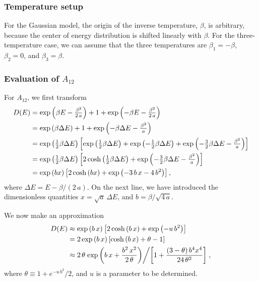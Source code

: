 \documentclass[aip,jcp,preprint,notitlepage, superscriptaddress]{revtex4-1}
\begin{document}
\subsubsection{Temperature setup}



For the Gaussian model,
the origin of the inverse temperature, $\beta$,
is arbitrary,
because the center of
energy distribution is shifted linearly with $\beta$.
%
For the three-temperature case,
we can assume that the three temperatures are
$\beta_1 = -\beta$,
$\beta_2 = 0$,
and
$\beta_3 = \beta$.



\subsubsection{Evaluation of $A_{12}$}



For $A_{12}$,
we first transform
\begin{align}
D(E)
&=
\exp\left(
  \beta E - \tfrac{ \beta^2 }{ 2 \, a }
\right)
+
1
+
\exp\left(
  -\beta E - \tfrac{ \beta^2 }{ 2 \, a }
\right)
\notag \\
&=
\exp\left(
  \beta \Delta E
\right)
+
1
+
\exp\left(
  -\beta \Delta E - \tfrac{ \beta^2 }{ a }
\right)
\notag \\
&=
\exp\left(
  \tfrac 1 2 \beta \Delta E
\right)
\left[
\exp\left(
  \tfrac 1 2 \beta \Delta E
\right)
+
\exp\left(
  -\tfrac 1 2 \beta \Delta E
\right)
+
\exp\left(
  -\tfrac 3 2 \beta \Delta E
  - \tfrac{ \beta^2 }{ a }
\right)
\right]
\notag \\
&=
\exp\left(
  \tfrac 1 2 \beta \Delta E
\right)
\left[
2 \cosh\left(
  \tfrac 1 2 \beta \Delta E
\right)
+
\exp\left(
  -\tfrac 3 2 \beta \Delta E
  - \tfrac{ \beta^2 }{ a }
\right)
\right]
\notag \\
&=
\exp\left(
  b x
\right)
\left[
2 \cosh\left(
  b x
\right)
+
\exp\left(
  -3 \, b \, x
  -4 \, b^2
\right)
\right],
\label{eq:DE_threeT_exact}
\end{align}
%
where $\Delta E = E - \beta/(2 \, a)$.
%
On the next line,
we have introduced
the dimensionless quantities
$x = \sqrt{a} \, \Delta E$,
and
$b = \beta / \sqrt{4 \, a}$.


We now make an approximation
\begin{align}
D(E)
&\approx
\exp\left(
  b \, x
\right)
\left[
2 \cosh\left(
  b \, x
\right)
+
\exp\left(
  - u \, b^2
\right)
\right]
\label{eq:DE_threeT_approx1}
\\
&=
2 \exp\left(
  b \, x
\right)
\left[
\cosh\left(
  b \, x
\right)
+
\theta - 1
\right]
\notag \\
&\approx
2 \, \theta
\left.
  \exp\left(
    b \, x
    +
    \frac{ b^2 \, x^2 }
    {2 \, \theta}
  \right)
\middle/
\left[
  1
  +
  \frac{ (3 - \theta) \, b^4 x^4 }
  { 24 \, \theta^2 }
\right]
\right.
,
\label{eq:DE_threeT_approx}
\end{align}
%
where
$\theta \equiv 1 + e^{-u \, b^2}/2$,
%
and
$u$ is a parameter to be determined.
\end{document}
